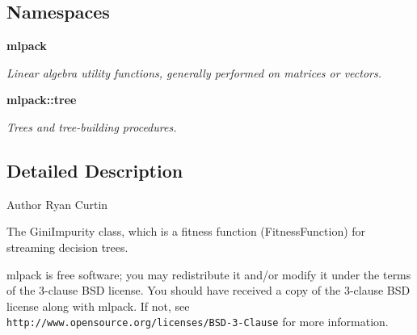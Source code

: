 \subsection*{Namespaces}
\begin{DoxyCompactItemize}
\item 
 {\bf mlpack}
\begin{DoxyCompactList}\small\item\em Linear algebra utility functions, generally performed on matrices or vectors. \end{DoxyCompactList}\item 
 {\bf mlpack\+::tree}
\begin{DoxyCompactList}\small\item\em Trees and tree-\/building procedures. \end{DoxyCompactList}\end{DoxyCompactItemize}


\subsection{Detailed Description}
\begin{DoxyAuthor}{Author}
Ryan Curtin
\end{DoxyAuthor}
The Gini\+Impurity class, which is a fitness function (Fitness\+Function) for streaming decision trees.

mlpack is free software; you may redistribute it and/or modify it under the terms of the 3-\/clause B\+SD license. You should have received a copy of the 3-\/clause B\+SD license along with mlpack. If not, see {\tt http\+://www.\+opensource.\+org/licenses/\+B\+S\+D-\/3-\/\+Clause} for more information. 